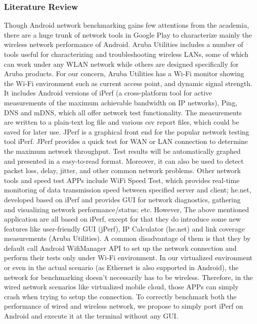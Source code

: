 \documentclass[journal,comsoc]{IEEEtran}
\begin{document}
\subsubsection{Literature Review}
Though Android network benchmarking gains few attentions from the academia, there are a huge trunk of network tools in Google Play to characterize mainly the wireless network performance of Android. Aruba Utilities\cite{aruba_utility} includes a number of tools useful for characterizing and troubleshooting wireless LANs, some of which can work under any WLAN network while others are designed specifically for Aruba products. For our concern, Aruba Utilities has a Wi-Fi monitor
showing the Wi-Fi environment such as current access point, and dynamic signal
strength. It includes Android versions of iPerf\cite{tirumala2005iperf} (a cross-platform tool for active measurements of the maximum achievable bandwidth on IP networks), Ping, DNS and mDNS, which all offer
network test functionality. The measurements are written to a plain-text log file and
various csv report files, which could be saved for later use. JPerf\cite{brethour2003jperf} is a graphical front end for the popular network testing tool iPerf. JPerf provides a quick test for WAN or LAN connection to determine the maximum network throughput. Test results will be automatically graphed and presented in a easy-to-read format. Moreover, it can also be used to detect packet loss, delay, jitter, and other common network problems. Other network tools and speed test APPs include WiFi Speed Test\cite{wifi_test}, which provides real-time monitoring of data transmission speed between specified server and client; he.net\cite{iperf}, developed based on iPerf and provides GUI for network diagnostics, gathering and visualizing network performance/status; etc. However, The above mentioned application are all based on iPerf, except for that they do introduce some new
features like user-friendly GUI (jPerf), IP Calculator (he.net) and
link coverage measurements (Aruba Utilities). A common disadvantage of them is that they by default call Android WifiManager API to set up the network connection and perform  their
tests only under Wi-Fi environment. In our virtualized environment or even in the actual scenario (as Ethernet is also supported in Android), the network for benchmarking doesn't necessarily has to be wireless. Therefore, in the wired network scenarios like virtualized mobile cloud, those APPs can simply crash when trying to setup the connection. To correctly benchmark both the performance of wired and wireless network, we propose to simply port iPerf on Android and execute it at the terminal without any GUI.
\end{document}
